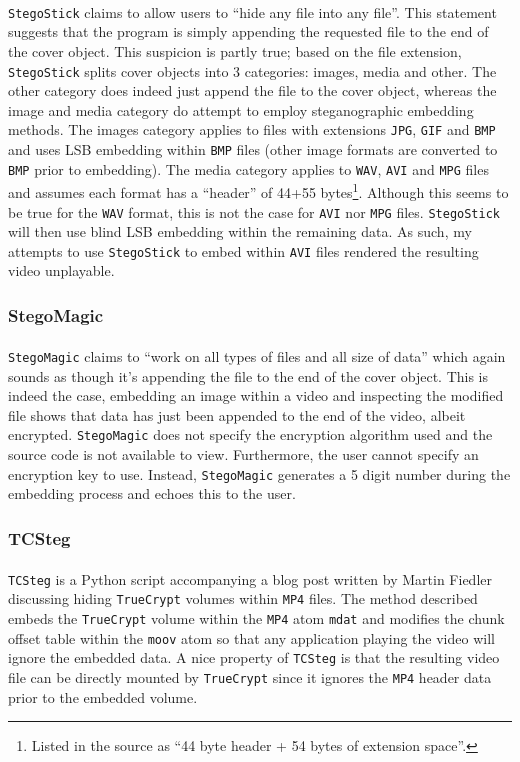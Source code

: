 \documentclass[paper=a4, fontsize=11pt,twoside]{scrartcl}
\numberwithin{table}{section}
\numberwithin{figure}{section}
\numberwithin{algorithm}{section}
\begin{document}
\texttt{StegoStick}\textsuperscript{\cite{stegostick}} claims to allow users to ``hide any file into any file''. This statement suggests that the program is simply appending the requested file to the end of the cover object. This suspicion is partly true; based on the file extension, \texttt{StegoStick} splits cover objects into 3 categories: images, media and other. The other category does indeed just append the file to the cover object, whereas the image and media category do attempt to employ steganographic embedding methods. The images category applies to files with extensions \texttt{JPG}, \texttt{GIF} and \texttt{BMP} and uses LSB embedding within \texttt{BMP} files (other image formats are converted to \texttt{BMP} prior to embedding). The media category applies to \texttt{WAV}, \texttt{AVI} and \texttt{MPG} files and assumes each format has a ``header'' of 44+55 bytes\footnote{Listed in the source as ``44 byte header + 54 bytes of extension space''.}. Although this seems to be true for the \texttt{WAV} format, this is not the case for \texttt{AVI} nor \texttt{MPG} files. \texttt{StegoStick} will then use blind LSB embedding within the remaining data. As such, my attempts to use \texttt{StegoStick} to embed within \texttt{AVI} files rendered the resulting video unplayable. %

\subsubsection{StegoMagic}

\texttt{StegoMagic}\textsuperscript{\cite{stegomagic}} claims to ``work on all types of files and all size of data'' which again sounds as though it's appending the file to the end of the cover object. This is indeed the case, embedding an image within a video and inspecting the modified file shows that data has just been appended to the end of the video, albeit encrypted. \texttt{StegoMagic} does not specify the encryption algorithm used and the source code is not available to view. Furthermore, the user cannot specify an encryption key to use. Instead, \texttt{StegoMagic} generates a 5 digit number during the embedding process and echoes this to the user.  

\subsubsection{TCSteg}

\texttt{TCSteg}\textsuperscript{\cite{tcsteg}} is a Python script accompanying a blog post written by Martin Fiedler discussing hiding \texttt{TrueCrypt} volumes within \texttt{MP4} files. The method described embeds the \texttt{TrueCrypt} volume within the \texttt{MP4} atom \texttt{mdat} and modifies the chunk offset table within the \texttt{moov} atom so that any application playing the video will ignore the embedded data. A nice property of \texttt{TCSteg} is that the resulting video file can be directly mounted by \texttt{TrueCrypt} since it ignores the \texttt{MP4} header data prior to the embedded volume.\\
\end{document}
